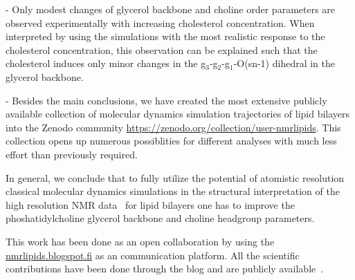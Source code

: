 \documentclass[journal=jacsat,manuscript=article]{achemso}
\begin{document}
- Only modest changes of glycerol backbone and choline order parameters are observed experimentally with increasing cholesterol concentration.
When interpreted by using the simulations with the most realistic response to the cholesterol concentration,
this observation can be explained such that the cholesterol induces only minor changes in the g$_3$-g$_2$-g$_1$-O(sn-1)
dihedral in the glycerol backbone.


- Besides the main conclusions, we have created the most extensive
publicly available collection of molecular dynamics simulation trajectories of lipid bilayers
into the Zenodo community \url{https://zenodo.org/collection/user-nmrlipids}. 
This collection opens up numerous possiblities for different analyses with
much less effort than previously required.

In general, we conclude that to fully utilize the potential of atomistic resolution classical molecular dynamics simulations
in the structural interpretation of the high resolution NMR data~\cite{ferreira14} for lipid bilayers one has to  
improve the phoshatidylcholine glycerol backbone and choline headgroup parameters.

This work has been done as an open collaboration by using the \url{nmrlipids.blogspot.fi} as an communication
platform. All the scientific contributions have been done through the blog and are publicly
available~\cite{nmrlipids}.  



\end{document}
